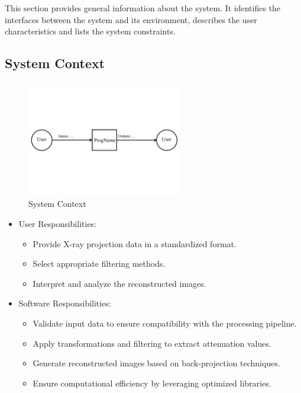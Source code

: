 \documentclass[12pt]{article}
\begin{document}
This section provides general information about the system.  It identifies the
interfaces between the system and its environment, describes the user
characteristics and lists the system constraints.

\subsection{System Context}
\begin{figure}[h!]
\begin{center}
 \includegraphics[width=0.6\textwidth]{SystemContextFigure}
\caption{System Context}
\label{Fig_SystemContext}
\end{center}
\end{figure}


\begin{itemize}
\item User Responsibilities:
\begin{itemize}
\item Provide X-ray projection data in a standardized format.
\item Select appropriate filtering methods.
\item Interpret and analyze the reconstructed images.
\end{itemize}
\end{itemize}


\begin{itemize}
\item Software Responsibilities:
\begin{itemize}
\item Validate input data to ensure compatibility with the processing pipeline.
\item Apply transformations and filtering to extract attenuation values.
\item Generate reconstructed images based on back-projection techniques.
\item Ensure computational efficiency by leveraging optimized libraries.
\end{itemize}
\end{itemize}
\end{document}
